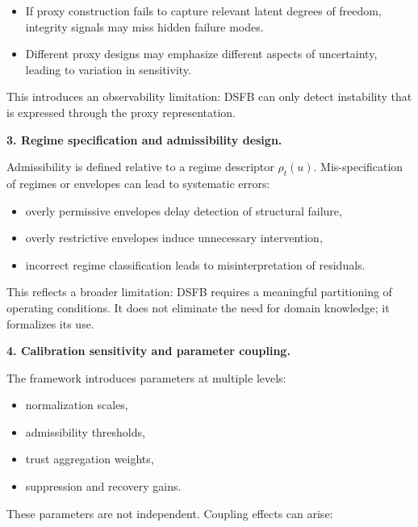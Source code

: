 \documentclass[11pt,letterpaper]{article}
\theoremstyle{gcresult}
\theoremstyle{definition}
\begin{document}
\begin{itemize}[leftmargin=1.5em]
    \item If proxy construction fails to capture relevant latent degrees of freedom, integrity signals may miss hidden failure modes.
    \item Different proxy designs may emphasize different aspects of uncertainty, leading to variation in sensitivity.
\end{itemize}

This introduces an observability limitation: DSFB can only detect instability that is expressed through the proxy representation.

\vspace{0.5em}
\noindent
\textbf{3. Regime specification and admissibility design.}

Admissibility is defined relative to a regime descriptor $\rho_t(u)$. Mis-specification of regimes or envelopes can lead to systematic errors:

\begin{itemize}[leftmargin=1.5em]
    \item overly permissive envelopes delay detection of structural failure,
    \item overly restrictive envelopes induce unnecessary intervention,
    \item incorrect regime classification leads to misinterpretation of residuals.
\end{itemize}

This reflects a broader limitation: DSFB requires a meaningful partitioning of operating conditions. It does not eliminate the need for domain knowledge; it formalizes its use.

\vspace{0.5em}
\noindent
\textbf{4. Calibration sensitivity and parameter coupling.}

The framework introduces parameters at multiple levels:

\begin{itemize}[leftmargin=1.5em]
    \item normalization scales,
    \item admissibility thresholds,
    \item trust aggregation weights,
    \item suppression and recovery gains.
\end{itemize}

These parameters are not independent. Coupling effects can arise:
\end{document}
